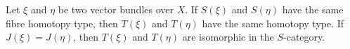 Let $\xi$ and $\eta$ be two vector bundles over $X$. If $S(\xi)$ and $S(\eta)$ have the same fibre homotopy type, then $T(\xi)$ and $T(\eta)$ have the same homotopy type. If $J(\xi) = J(\eta)$, then $T(\xi)$ and $T(\eta)$ are isomorphic in the $S$-category.
